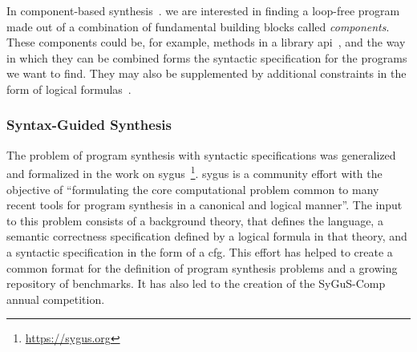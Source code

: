 In component-based
synthesis~\cite{Shi:2019:FCS,Feng:2018:PSU,Feng:2017:CST,Feng:2017:CSC,Jha:oracle:2010}.
we are interested in finding a loop-free program made out of a combination of
fundamental building blocks called \textit{components}. These components could
be, for example, methods in a library
\gls{api}~\cite{Shi:2019:FCS,Feng:2017:CSC}, and the way in which they can be
combined forms the syntactic specification for the programs we want to find.
They may also be supplemented by additional constraints in the form of logical
formulas~\cite{Feng:2018:PSU}.

\subsubsection{Syntax-Guided Synthesis}
\label{sec:sygus}

The problem of program synthesis with syntactic specifications was generalized
and formalized in the work on
\gls{sygus}~\cite{Alur:sygus:2013}\footnote{\url{https://sygus.org}}.
\gls{sygus} is a community effort with the objective of ``formulating the core
computational problem common to many recent tools for program synthesis in a
canonical and logical manner''.
The input to this problem consists of a background theory, that defines the
language, a semantic correctness specification defined by a logical formula in
that theory, and a syntactic specification in the form of a \gls{cfg}.
This effort has helped to create a common format for the definition of program
synthesis problems and a growing repository of benchmarks. It has also led to
the creation of the SyGuS-Comp annual competition.